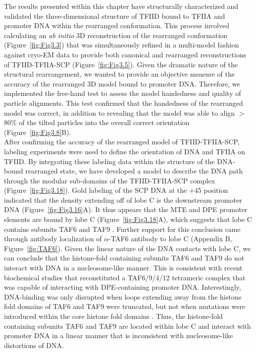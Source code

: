 The results presented within this chapter have structurally characterized and validated the three-dimensional structure of TFIID bound to TFIIA and promoter DNA within the rearranged conformation. This process involved calculating an \emph{ab initio} 3D reconstruction of the rearranged conformation (Figure~\ref{fig:Fig3.3}) that was simultaneously refined in a multi-model fashion against cryo-EM data to provide both canonical and rearranged reconstructions of TFIID-TFIIA-SCP (Figure~\ref{fig:Fig3.5}). Given the dramatic nature of the structural rearrangement, we wanted to provide an objective measure of the accuracy of the rearranged 3D model bound to promoter DNA. Therefore, we implemented the free-hand test to assess the model handedness and quality of particle alignments. This test confirmed that the handedness of the rearranged model was correct, in addition to revealing that the model was able to align $>$ 80\% of the tilted particles into the overall correct orientation (Figure~\ref{fig:Fig3.8}B).  \\
\indent After confirming the accuracy of the rearranged model of TFIID-TFIIA-SCP, labeling experiments were used to define the orientation of DNA and TFIIA on TFIID. By integrating these labeling data within the structure of the DNA-bound rearranged state, we have developed a model to describe the DNA path through the modular sub-domains of the TFIID-TFIIA-SCP complex (Figure~\ref{fig:Fig3.18}). Gold labeling of the SCP DNA at the +45 position indicated that the density extending off of lobe C is the downstream promoter DNA (Figure~\ref{fig:Fig3.16}A). It thus appears that the MTE and DPE promoter elements are bound by lobe C (Figure~\ref{fig:Fig3.18}A), which suggests that lobe C contains subunits TAF6 and TAF9 \cite{Burke_2739, Theisen_341}. Further support for this conclusion came through antibody localization of $\alpha$-TAF6 antibody to lobe C (Appendix B, Figure~\ref{fig:TAF6}). Given the linear nature of the DNA contacts with lobe C, we can conclude that the histone-fold containing subunits TAF6 and TAF9 do not interact with DNA in a nucleosome-like manner. This is consistent with recent biochemical studies that reconstituted a TAF6/9/4/12 tetrameric complex that was capable of interacting with DPE-containing promoter DNA. Interestingly, DNA-binding was only disrupted when loops extending away from the histone fold domains of TAF6 and TAF9 were truncated, but not when mutations were introduced within the core histone fold domains  \cite{Shao_1340}. Thus, the histone-fold containing subunits TAF6 and TAF9 are located within lobe C and interact with promoter DNA in a linear manner that is inconsistent with nucleosome-like distortions of DNA. \\ 
